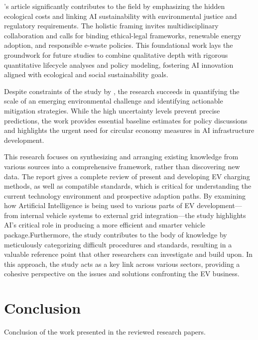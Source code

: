 \documentclass[a4paper, 12pt]{article}
\begin{document}
\citet{Zhuk2023}'s article significantly contributes to the field by emphasizing the hidden ecological costs and linking AI sustainability with environmental justice and regulatory requirements. The holistic framing invites multidisciplinary collaboration and calls for binding ethical-legal frameworks, renewable energy adoption, and responsible e-waste policies. This foundational work lays the groundwork for future studies to combine qualitative depth with rigorous quantitative lifecycle analyses and policy modeling, fostering AI innovation aligned with ecological and social sustainability goals.\hfill \break

Despite constraints of the study by \citet{wang_2024_ewaste}, the research succeeds in quantifying the scale of an emerging environmental challenge and identifying actionable mitigation strategies. While the high uncertainty levels prevent precise predictions, the work provides essential baseline estimates for policy discussions and highlights the urgent need for circular economy measures in AI infrastructure development.\hfill \break

This research \citet{M.rauf2024} focuses on synthesizing and arranging existing knowledge from various sources into a comprehensive framework, rather than discovering new data.  The report gives a complete review of present and developing EV charging methods, as well as compatible standards, which is critical for understanding the current technology environment and prospective adaption paths.  By examining how Artificial Intelligence is being used to various parts of EV development—from internal vehicle systems to external grid integration—the study highlights AI's critical role in producing a more efficient and smarter vehicle package.Furthermore, the study contributes to the body of knowledge by meticulously categorizing difficult procedures and standards, resulting in a valuable reference point that other researchers can investigate and build upon.  In this approach, the study acts as a key link across various sectors, providing a cohesive perspective on the issues and solutions confronting the EV business.

\section{Conclusion}
Conclusion of the work presented in the reviewed research papers.
\end{document}
